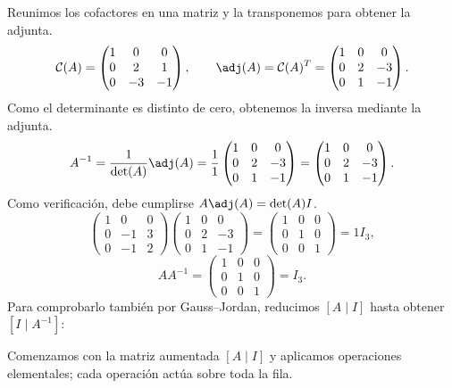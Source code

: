 Reunimos los cofactores en una matriz y la transponemos para obtener la adjunta.
\[
\mathcal{C}(A)=\begin{pmatrix}1&0&0\\0&2&1\\0&-3&-1\end{pmatrix},\qquad\adj(A)=\mathcal{C}(A)^T=\begin{pmatrix}1&0&0\\0&2&-3\\0&1&-1\end{pmatrix}.
\]
Como el determinante es distinto de cero, obtenemos la inversa mediante la adjunta.
\[
A^{-1}=\frac1{\det(A)}\adj(A)=\frac1{1}\begin{pmatrix}1&0&0\\0&2&-3\\0&1&-1\end{pmatrix}=\begin{pmatrix}1&0&0\\0&2&-3\\0&1&-1\end{pmatrix}.
\]
Como verificación, debe cumplirse $A\adj(A)=\det(A)I$.
\[
\begin{pmatrix}1&0&0\\0&-1&3\\0&-1&2\end{pmatrix}\begin{pmatrix}1&0&0\\0&2&-3\\0&1&-1\end{pmatrix}=\begin{pmatrix}1&0&0\\0&1&0\\0&0&1\end{pmatrix}=1I_{3},
\]
\[
AA^{-1}=\begin{pmatrix}1&0&0\\0&1&0\\0&0&1\end{pmatrix}=I_{3}.
\]
Para comprobarlo también por Gauss--Jordan, reducimos $[A\mid I]$ hasta obtener $[I\mid A^{-1}]$:

Comenzamos con la matriz aumentada $[A\mid I]$ y aplicamos operaciones elementales; cada operación actúa sobre toda la fila.

